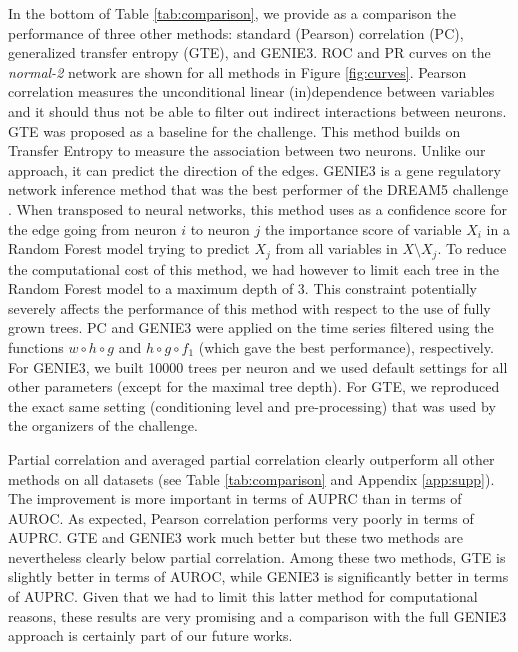 \documentclass[wcp]{jmlr}
\begin{document}
In the bottom of Table \ref{tab:comparison}, we provide as a comparison the
performance of three other methods: standard (Pearson) correlation (PC),
generalized transfer entropy (GTE), and GENIE3. ROC and PR curves on the
\textit{normal-2} network are shown for all methods in Figure
\ref{fig:curves}. Pearson correlation measures the unconditional linear
(in)dependence between variables and it should thus not be able to filter out
indirect interactions between neurons. GTE \citep{stetter2012model} was
proposed as a baseline for the challenge. This method builds on Transfer
Entropy to measure the association between two neurons. Unlike our approach, it
can predict the direction of the edges. GENIE3 \citep{huynhthu2010inferring} is
a gene regulatory network inference method that was the best performer of the
DREAM5 challenge \citep{marbach2012}. When transposed to neural networks, this
method uses as a confidence score for the edge going from neuron $i$ to neuron
$j$ the importance score of variable $X_i$ in a Random Forest model trying to
predict $X_j$ from all variables in $X\setminus X_j$. To reduce the
computational cost of this method, we had however to limit each tree in the
Random Forest model to a maximum depth of 3. This constraint potentially
severely affects the performance of this method with respect to the use of
fully grown trees. PC and GENIE3 were applied on the time series filtered using the functions $w\circ h\circ g$ and $h\circ g\circ f_1$ (which
gave the best performance), respectively. For GENIE3, we built 10000 trees per neuron and we
used default settings for all other parameters (except for the maximal tree
depth). For GTE, we reproduced the exact same setting (conditioning level and
pre-processing) that was used by the organizers of the challenge.


Partial correlation and averaged partial correlation clearly outperform all
other methods on all datasets (see Table \ref{tab:comparison} and Appendix \ref{app:supp}). The
improvement is more important in terms of AUPRC than in terms of AUROC. As
expected, Pearson correlation performs very poorly in terms of AUPRC. GTE and
GENIE3 work much better but these two methods are nevertheless clearly below
partial correlation. Among these two methods, GTE is slightly better in terms
of AUROC, while GENIE3 is significantly better in terms of AUPRC. Given that we
had to limit this latter method for computational reasons, these results are
very promising and a comparison with the full GENIE3 approach is certainly part
of our future works.
\end{document}

